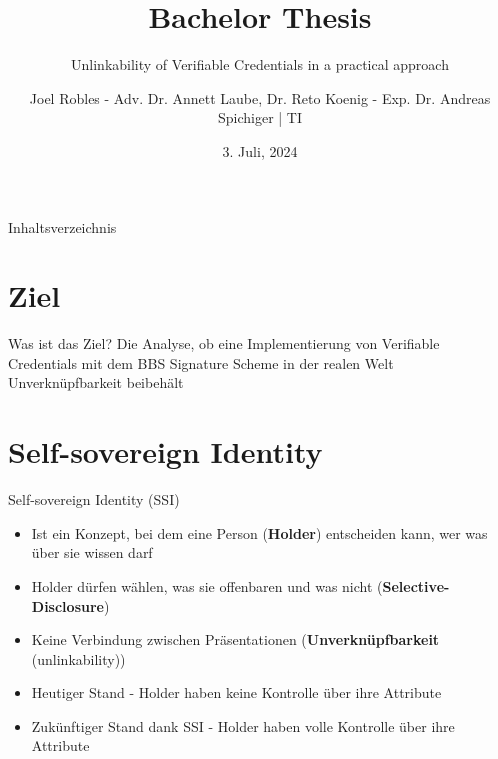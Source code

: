 \documentclass[
	german,%
	authorontitle=true,
	]{bfhbeamer}
\title{Bachelor Thesis}
\subtitle{Unlinkability of Verifiable Credentials in a practical approach}
\author[J. Robles]{Joel Robles - Adv. Dr. Annett Laube, Dr. Reto Koenig - Exp. Dr. Andreas Spichiger | TI}
\date{3. Juli, 2024}
\begin{document}
\maketitle

\begin{frame}{Inhaltsverzeichnis}
    \tableofcontents
\end{frame}

\section{Ziel}

\begin{frame}{Was ist das Ziel?}
    \centering
    Die Analyse, ob eine Implementierung von Verifiable Credentials mit dem BBS Signature Scheme in der realen Welt Unverknüpfbarkeit beibehält
\end{frame}

\section{Self-sovereign Identity}

\begin{frame}{Self-sovereign Identity (SSI)}
    \begin{itemize}
        \item Ist ein Konzept, bei dem eine Person (\textbf{Holder}) entscheiden kann, wer was über sie wissen darf
        \item Holder dürfen wählen, was sie offenbaren und was nicht (\textbf{Selective-Disclosure})
        \item Keine Verbindung zwischen Präsentationen (\textbf{Unverknüpfbarkeit} (unlinkability))
        \item Heutiger Stand - Holder haben keine Kontrolle über ihre Attribute
        \item Zukünftiger Stand dank SSI - Holder haben volle Kontrolle über ihre Attribute
    \end{itemize}
\end{frame}
\end{document}
